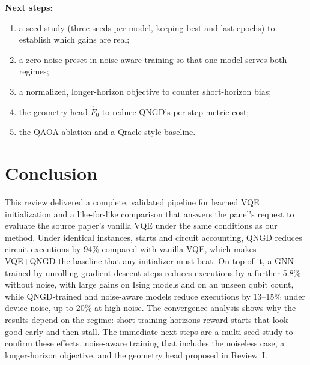 \documentclass{ssnreview}
\begin{document}
\textbf{Next steps:}
\begin{enumerate}[label=(\roman*)]
  \item a seed study (three seeds per model, keeping best and last epochs) to establish which
        gains are real;
  \item a zero-noise preset in noise-aware training so that one model serves both regimes;
  \item a normalized, longer-horizon objective to counter short-horizon bias;
  \item the geometry head $\hat F_0$ to reduce QNGD's per-step metric cost;
  \item the QAOA ablation and a Qracle-style baseline.
\end{enumerate}

\chapter{Conclusion}

This review delivered a complete, validated pipeline for learned VQE initialization and a
like-for-like comparison that answers the panel's request to evaluate the source paper's
vanilla VQE under the same conditions as our method. Under identical instances, starts and
circuit accounting, QNGD reduces circuit executions by 94\% compared with vanilla VQE, which
makes VQE+QNGD the baseline that any initializer must beat. On top of it, a GNN trained by
unrolling gradient-descent steps reduces executions by a further 5.8\% without noise, with large
gains on Ising models and on an unseen qubit count, while QNGD-trained and noise-aware models
reduce executions by 13--15\% under device noise, up to 20\% at high noise. The convergence
analysis shows why the results depend on the regime: short training horizons reward starts that
look good early and then stall. The immediate next steps are a multi-seed study to confirm these
effects, noise-aware training that includes the noiseless case, a longer-horizon objective, and
the geometry head proposed in Review~I.
\end{document}
